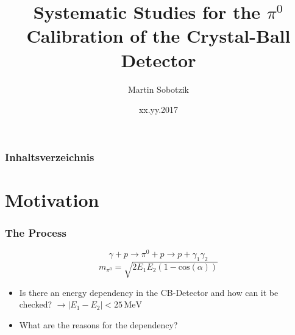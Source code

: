 \documentclass{beamer}
\title{Systematic Studies for the $\pi^0$ Calibration of the Crystal-Ball Detector}
\author{Martin Sobotzik}
\institute{Johannes-Gutenberg Universit\"at Mainz}
\date{xx.yy.2017}
\begin{document}
 

\begin{frame} 
\titlepage 
\end{frame} 


\begin{frame} 
\frametitle{Inhaltsverzeichnis} 
\tableofcontents[currentsection]
\end{frame} 
\section{Motivation}
\begin{frame}

		\frametitle{The Process}
	
		\begin{equation}
			\gamma + p \rightarrow \pi^0 +p \rightarrow p + \gamma_1 \gamma_2
		\end{equation}
		\begin{equation}
		m_{\pi^0}=\sqrt{2 E_1E_2(1-\text{cos}(\alpha))}
		\end{equation}
		\pause
			\begin{itemize}
		\item Is there an energy dependency in the CB-Detector and how can it be checked?
		\pause
		 $\rightarrow |E_1 - E_2|<25\,\text{MeV}$
		\pause

		\item What are the reasons for the dependency?
	\end{itemize}
\end{frame}
\end{document}
